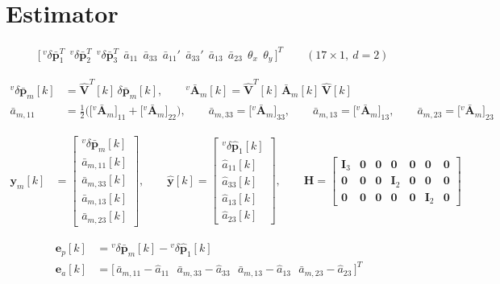 \documentclass[11pt,a4paper]{ctexart}
\newcommand{\setline}[1]{\par\medskip\noindent{\small\textcolor[gray]{0.35}{#1}}}
\newcommand{\dl}{\delta}
\newcommand{\Am}{\bar{\mathbf A}_m}
\newcommand{\dpb}{\dl\bar{\mathbf p}}
\newcommand{\I}{\mathbf I}
\newcommand{\Vh}{\hat{\mathbf V}}
\newcommand{\apar}{\bar a_{11}}
\newcommand{\aper}{\bar a_{33}}
\newcommand{\T}{T}
\newcommand{\vAm}{{}^{v}\bar{\mathbf A}_m}
\newcommand{\vdp}{{}^{v}\dl\bar{\mathbf p}}
\newcommand{\vdph}{{}^{v}\dl\hat{\mathbf p}}
\begin{document}
\section{Estimator}
\begin{align*}
&\big[\,\vdp_1^{\T}\ \ \vdp_2^{\T}\ \ \vdp_3^{\T}\ \ \apar\ \ \aper\ \ \apar'\ \ \aper'\ \ \bar a_{13}\ \ \bar a_{23}\ \ \theta_x\ \ \theta_y\,\big]^{\T} \qquad (17 \times 1,\ d = 2)
\end{align*}
\setline{process outputs in the local coordinate}
\begin{align*}
{}^{v}\dpb_m[k] &= \Vh^{\T}[k]\,\dpb_m[k], \qquad \vAm[k] = \Vh^{\T}[k]\,\Am[k]\,\Vh[k] \\
\bar a_{m,11} &= \tfrac{1}{2}\Big(\big[\vAm\big]_{11} + \big[\vAm\big]_{22}\Big), \qquad \bar a_{m,33} = \big[\vAm\big]_{33}, \qquad
\bar a_{m,13} = \big[\vAm\big]_{13}, \qquad \bar a_{m,23} = \big[\vAm\big]_{23}
\end{align*}
\setline{process outputs, their estimates and the output matrix (no measurement of the angles)}
\begin{align*}
\mathbf y_m[k] &= \begin{bmatrix} {}^{v}\dpb_m[k] \\ \bar a_{m,11}[k] \\ \bar a_{m,33}[k] \\ \bar a_{m,13}[k] \\ \bar a_{m,23}[k] \end{bmatrix}, \qquad
\hat{\mathbf y}[k] = \begin{bmatrix} \vdph_1[k] \\ \hat a_{11}[k] \\ \hat a_{33}[k] \\ \hat a_{13}[k] \\ \hat a_{23}[k] \end{bmatrix}, \qquad
\mathbf H = \begin{bmatrix} \I_3 & \mathbf 0 & \mathbf 0 & \mathbf 0 & \mathbf 0 & \mathbf 0 & \mathbf 0 \\ \mathbf 0 & \mathbf 0 & \mathbf 0 & \I_2 & \mathbf 0 & \mathbf 0 & \mathbf 0 \\ \mathbf 0 & \mathbf 0 & \mathbf 0 & \mathbf 0 & \mathbf 0 & \I_2 & \mathbf 0 \end{bmatrix}
\end{align*}
\setline{feedback: measured $-$ estimate ($\mathbf e_a$: the four gain elements)}
\begin{align*}
\mathbf e_p[k] &= {}^{v}\dpb_m[k] - \vdph_1[k] \\
\mathbf e_a[k] &= \big[\,\bar a_{m,11} - \hat a_{11}\ \ \ \bar a_{m,33} - \hat a_{33}\ \ \ \bar a_{m,13} - \hat a_{13}\ \ \ \bar a_{m,23} - \hat a_{23}\,\big]^{\T}
\end{align*}
\end{document}
